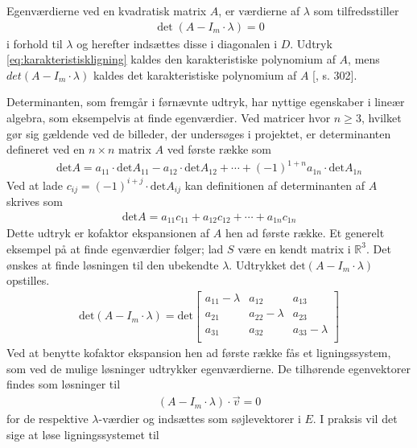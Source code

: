 Egenværdierne ved en kvadratisk matrix $A$, er værdierne af $\lambda$ som tilfredsstiller
\begin{align}\label{eq:karakteristiskligning}
\det(A - I_m \cdot \lambda ) = 0
\end{align}
i forhold til $\lambda$ og herefter indsættes disse i diagonalen i $D$.
Udtryk \ref{eq:karakteristiskligning} kaldes den karakteristiske polynomium af $A$, mens $det(A - I_m \cdot \lambda)$ kaldes det karakteristiske polynomium af $A$ [\citet{linalg}, s. 302].

Determinanten, som fremgår i førnævnte udtryk, har nyttige egenskaber i lineær algebra, som eksempelvis at finde egenværdier. Ved matricer hvor $n \geq 3$, hvilket gør sig gældende ved de billeder, der undersøges i projektet, er determinanten defineret ved en $n \times n$ matrix $A$ ved første række som
\begin{align*}
\textrm{det}A=a_{11}\cdot \textrm{det}A_{11} - a_{12} \cdot \textrm{det}A_{12}+\cdots +(-1)^{1+n}a_{1n}\cdot \textrm{det}A_{1n}
\end{align*}
Ved at lade $c_{ij} = (-1)^{i+j}\cdot\textrm{det}A_{ij}$ kan definitionen af determinanten af $A$ skrives som
\begin{align*}
\textrm{det}A=a_{11}c_{11}+a_{12}c_{12}+\cdots+a_{1n}c_{1n}
\end{align*}
Dette udtryk er kofaktor ekspansionen af $A$ hen ad første række.
Et generelt eksempel på at finde egenværdier følger; lad $S$ være en kendt matrix i $\mathbb{R}^3$. Det ønskes at finde løsningen til den ubekendte $\lambda$. Udtrykket $\textrm{det}(A - I_m \cdot \lambda )$ opstilles.
\begin{align*}
\textrm{det}(A - I_m \cdot \lambda) = \text{det}\begin{bmatrix}
a_{11} - \lambda & a_{12} & a_{13}\\
a_{21} & a_{22} - \lambda & a_{23}\\
a_{31} & a_{32} & a_{33} - \lambda\\
\end{bmatrix}
\end{align*}
Ved at benytte kofaktor ekspansion hen ad første række fås et ligningssystem, som ved de mulige løsninger udtrykker egenværdierne. 
De tilhørende egenvektorer findes som løsninger til
\begin{align*}
(A - I_m \cdot \lambda) \cdot \vec{v} = 0
\end{align*} for de respektive $\lambda$-værdier og indsættes som søjlevektorer i $E$. I praksis vil det sige at løse ligningssystemet til
